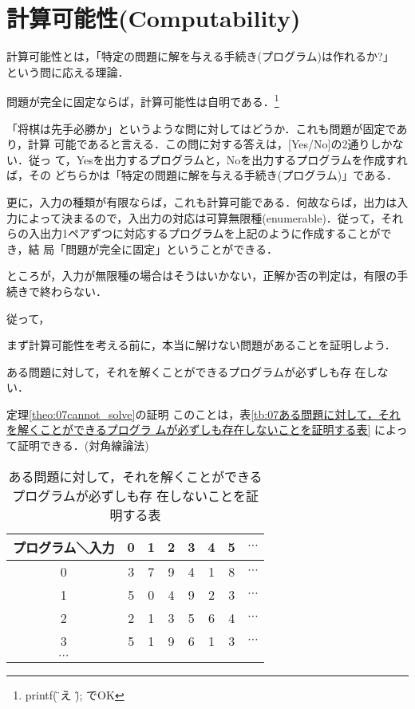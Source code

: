 \chapter{計算可能性(Computability)}
計算可能性とは，「特定の問題に解を与える手続き(プログラム)は作れるか?」
という問に応える理論．

問題が完全に固定ならば，計算可能性は自明である．\footnote{printf(\"答え
\"); でOK}

「将棋は先手必勝か」というような問に対してはどうか．これも問題が固定であ
り，計算
可能であると言える．この問に対する答えは，[Yes/No]の2通りしかない．従っ
て，Yesを出力するプログラムと，Noを出力するプログラムを作成すれば，その
どちらかは「特定の問題に解を与える手続き(プログラム)」である．

更に，入力の種類が有限ならば，これも計算可能である．何故ならば，出力は入
力によって決まるので，入出力の対応は可算無限種(enumerable)．従って，それ
らの入出力1ペアずつに対応するプログラムを上記のように作成することができ，結
局「問題が完全に固定」ということができる．

ところが，入力が無限種の場合はそうはいかない，正解か否の判定は，有限の手
続きで終わらない．

従って，

まず計算可能性を考える前に，本当に解けない問題があることを証明しよう．

\begin{mytheorem} \label{theo:07cannot_solve}
 ある問題に対して，それを解くことができるプログラムが必ずしも存
 在しない．
\end{mytheorem}

\begin{myproof}{定理\ref{theo:07cannot_solve}の証明}
このことは，表\ref{tb:07ある問題に対して，それを解くことができるプログラ
 ムが必ずしも存在しないことを証明する表}
 によって証明できる．(対角線論法) \footnotemark
\end{myproof}
 

\begin{table}
 \caption{ある問題に対して，それを解くことができるプログラムが必ずしも存
 在しないことを証明する表}
 \begin{center}
  \begin{tabular}{c|c|c|c|c|c|c|c}
   \hline
   プログラム＼入力 &0&1&2&3&4&5&$\cdots$ \\
    \hline \hline
   0&3&7&9&4&1&8&$\cdots$\\ \hline
   1&5&0&4&9&2&3&$\cdots$\\ \hline
   2&2&1&3&5&6&4&$\cdots$\\ \hline
   3&5&1&9&6&1&3&$\cdots$\\ \hline
   $\cdots$&&&&&&\\ \hline
  \end{tabular}
  \label{tb:07ある問題に対して，それを解くことができるプログラムが必ずしも存在しないことを証明する表}
 \end{center}
\end{table}


